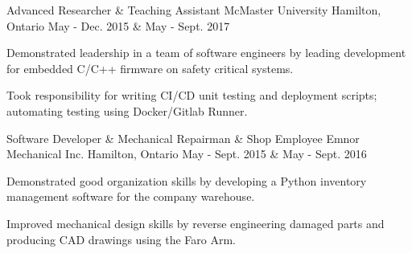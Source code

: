 \begin{cventries}
  \cventry
    {Advanced Researcher \& Teaching Assistant} %
    {McMaster University} %
    {Hamilton, Ontario} %
    {May - Dec. 2015 \& May - Sept. 2017} %
    {
      \begin{cvitems} %
        \item {Demonstrated leadership in a team of software engineers by leading development for embedded C/C++ firmware on safety critical systems.}
        \item {Took responsibility for writing CI/CD unit testing and deployment scripts; automating testing using Docker/Gitlab Runner.}
      \end{cvitems}
    }

  \cventry
    {Software Developer \& Mechanical Repairman \& Shop Employee} %
    {Emnor Mechanical Inc.} %
    {Hamilton, Ontario} %
    {May - Sept. 2015 \& May - Sept. 2016} %
    {
      \begin{cvitems} %
        \item {Demonstrated good organization skills by developing a Python inventory management software for the company warehouse.}
        \item {Improved mechanical design skills by reverse engineering damaged parts and producing CAD drawings using the Faro Arm.}
      \end{cvitems}
    }


\end{cventries}
